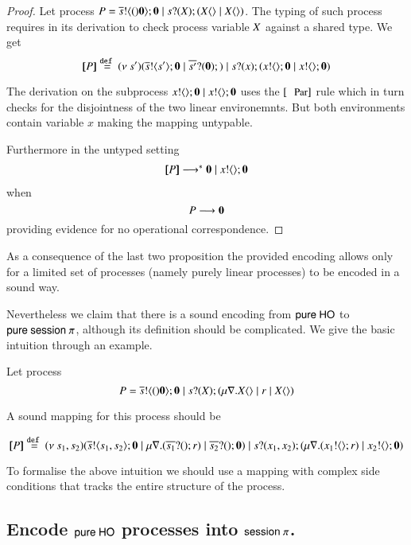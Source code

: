 \begin{proof}
	Let process $P = \overline{s} ! \langle ()\mathbf{0} \rangle ; \mathbf{0} \;|\; s ? (X) ; (X\langle  \rangle \;|\; X\langle  \rangle)$.
	The typing of such process requires in its derivation to check process variable $X$ against a
	shared type.
%
	We get
	\[
		[\!\![P]\!\!] \stackrel{\mathtt{def}\ }{=} (\nu\ s')(\overline{s} ! \langle s' \rangle ; \mathbf{0} \;|\; \overline{s'}{} ? (\mathbf{0}) ;) \;|\; s ? (x) ; (x ! \langle  \rangle ; \mathbf{0} \;|\; x ! \langle  \rangle ; \mathbf{0})
	\]

	The derivation on the subprocess $x ! \langle  \rangle ; \mathbf{0} \;|\; x ! \langle  \rangle ; \mathbf{0}$
	uses the $\trule{Par}$ rule which in turn checks for the disjointness of
	the two linear environemnts. But both environments contain variable $x$
	making the mapping untypable.

	Furthermore in the untyped setting
%
	\[
		\begin{array}{rcl}
			[\!\![P]\!\!] \longrightarrow^* \mathbf{0} \;|\; x ! \langle  \rangle ; \mathbf{0}
		\end{array}
	\]
	when
	\[
		P \longrightarrow \mathbf{0}
	\]
	providing evidence for no operational correspondence.
\end{proof}

As a consequence of the last two proposition the provided encoding
allows only for a limited set of processes (namely purely linear processes)
to be encoded in a sound way.

Nevertheless we claim that there is a sound encoding from
$\mathsf{pure\ HO}$ to $\mathsf{pure\ session\ }\pi$, although its definition should be complicated.
We give the basic intuition through an example.

\begin{example}
	Let process 
	\[
		P = \overline{s} ! \langle ()\mathbf{0} \rangle ; \mathbf{0} \;|\; s ? (X) ; (\mu \mathcal{r}. X\langle  \rangle \;|\; r \;|\; X\langle  \rangle)
	\]

	A sound mapping for this process should be

	\[
		[\!\![P]\!\!] \stackrel{\mathtt{def}\ }{=} (\nu\ s_1, s_2)(\overline{s} ! \langle s_1, s_2 \rangle ; \mathbf{0} \;|\; \mu \mathcal{r}. (\overline{s_1} ? () ; r) \;|\; \overline{s_2} ? () ; \mathbf{0}) \;|\; s ? (x_1, x_2) ; (\mu \mathcal{r}. (x_1 ! \langle  \rangle ; r) \;|\; x_2 ! \langle  \rangle ; \mathbf{0})
	\]
\end{example}

To formalise the above intuition we should use a mapping with
complex side conditions that tracks the entire structure of the
process.

\subsection{Encode $\mathsf{pure\ HO}$ processes into $\mathsf{session\ }\pi$.}

